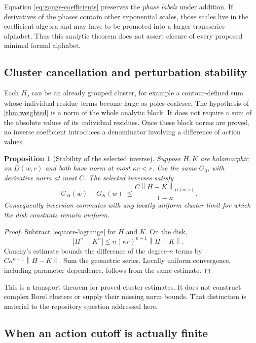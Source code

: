 \documentclass[11pt,a4paper]{article}
\numberwithin{equation}{section}
\newtheorem{proposition}[theorem]{Proposition}
\theoremstyle{definition}
\theoremstyle{remark}
\newcommand{\norm}[1]{\left\|#1\right\|}
\begin{document}
Equation \eqref{eq:gauge-coefficients} preserves the \emph{phase labels}
under addition. If derivatives of the phases contain other exponential
scales, those scales live in the coefficient algebra and may have to be
promoted into a larger transseries alphabet. Thus this analytic theorem
does not assert closure of every proposed minimal formal alphabet.

\subsection{Cluster cancellation and perturbation stability}

Each $H_j$ can be an already grouped cluster, for example a contour-defined
sum whose individual residue terms become large as poles coalesce. The
hypothesis of \cref{thm:weighted} is a norm of the whole analytic block.
It does not require a sum of the absolute values of its individual
residues. Once these block norms are proved, no inverse coefficient
introduces a denominator involving a difference of action values.

\begin{proposition}[Stability of the selected inverse]\label{prop:stability}
Suppose $H,K$ are holomorphic on $\overline D(w,r)$ and both have norm at
most $\kappa r<r$. Use the same $G_0$, with derivative norm at most $C$.
The selected inverses satisfy
\begin{equation}\label{eq:stability}
 |G_H(w)-G_K(w)|\le
 \frac{C\norm{H-K}_{\overline D(w,r)}}{1-\kappa}.
\end{equation}
Consequently inversion commutes with any locally uniform cluster limit
for which the disk constants remain uniform.
\end{proposition}

\begin{proof}
Subtract \eqref{eq:core-lagrange} for $H$ and $K$. On the disk,
\[
 |H^n-K^n|\le n(\kappa r)^{n-1}\norm{H-K}.
\]
Cauchy's estimate bounds the difference of the degree-$n$ terms by
$C\kappa^{n-1}\norm{H-K}$. Sum the geometric series. Locally uniform
convergence, including parameter dependence, follows from the same estimate.
\end{proof}

This is a transport theorem for proved cluster estimates. It does not
construct complex Borel clusters or supply their missing norm bounds.
That distinction is material to the repository question addressed here.

\subsection{When an action cutoff is actually finite}
\end{document}
